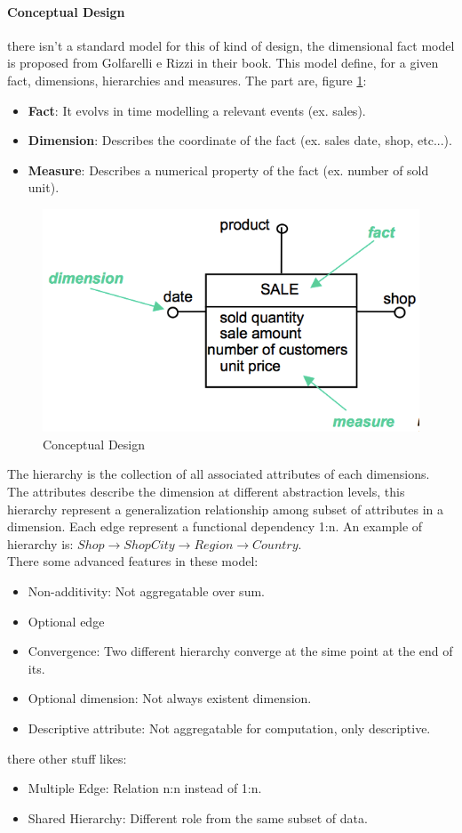 \documentclass[12pt]{article}
\begin{document}
\paragraph{Conceptual Design} there isn't a standard model for this of kind of design, the dimensional fact model is proposed from Golfarelli e Rizzi in their book. This model define, for a given fact, dimensions, hierarchies and measures. The part are, figure \ref{fig:conce}:
\begin{itemize}
  \item \textbf{Fact}: It evolvs in time modelling a relevant events (ex. sales).
  \item \textbf{Dimension}: Describes the coordinate of the fact (ex. sales date, shop, etc...).
  \item \textbf{Measure}: Describes a numerical property of the fact (ex. number of sold unit).
\end{itemize}
\begin{figure}[h!]
  \includegraphics[width=\linewidth]{images/conce.png}
  \caption{Conceptual Design}
  \label{fig:conce}
\end{figure}
The hierarchy is the collection of all associated attributes of each dimensions. The attributes describe the dimension at different abstraction levels, this hierarchy represent a generalization relationship among subset of attributes in a dimension. Each edge represent a functional dependency 1:n. An example of hierarchy is: $Shop \rightarrow ShopCity \rightarrow Region \rightarrow Country$.\\
There some advanced features in these model:
\begin{itemize}
  \item Non-additivity: Not aggregatable over sum.
  \item Optional edge
  \item Convergence: Two different hierarchy converge at the sime point at the end of its.
  \item Optional dimension: Not always existent dimension.
  \item Descriptive attribute: Not aggregatable for computation, only descriptive.
\end{itemize}
there other stuff likes:
\begin{itemize}
  \item Multiple Edge: Relation n:n instead of 1:n.
  \item Shared Hierarchy: Different role from the same subset of data.
\end{itemize}
\end{document}
